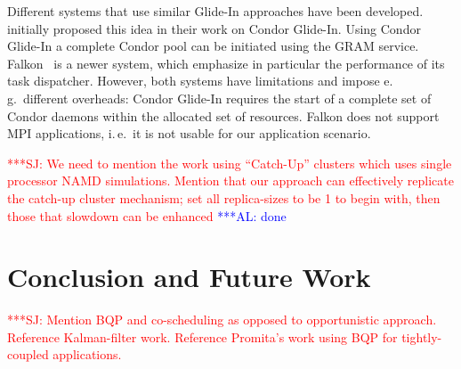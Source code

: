 \documentclass{rspublic}
\newcommand{\alnote}[1]{ {\textcolor{blue} { ***AL: #1 }}}
\newcommand{\jhanote}[1]{ {\textcolor{red} { ***SJ: #1 }}}
\newcommand{\alnote}[1]{}
\newcommand{\jhanote}[1]{}
\newcommand{\glidein}[1]{Glide-In }
\begin{document}
Different systems that use similar Glide-In approaches have been
developed. \citet{citeulike:291860} initially proposed this idea in
their work on Condor Glide-In. Using Condor Glide-In a complete Condor
pool can be initiated using the GRAM service. Falkon~\citep{1362680}
is a newer system, which emphasize in particular the performance of
its task dispatcher.  However, both systems have limitations and
impose e.\,g.\ different overheads: Condor \glidein\ requires the
start of a complete set of Condor daemons within the allocated set of
resources. 
Falkon  does not support MPI applications, i.\,e.\ it is not usable for our
application scenario.  

\jhanote{We need to mention the work using ``Catch-Up'' clusters which
  uses single processor NAMD simulations. Mention that our approach
  can effectively replicate the catch-up cluster mechanism; set all
  replica-sizes to be 1 to begin with, then those that slowdown can
  be enhanced}
\alnote{done}


\section{Conclusion and Future Work}

\jhanote{Mention BQP and co-scheduling as opposed to opportunistic
  approach. Reference Kalman-filter work. Reference Promita's work
  using BQP for tightly-coupled applications.} 
                
\end{document}
